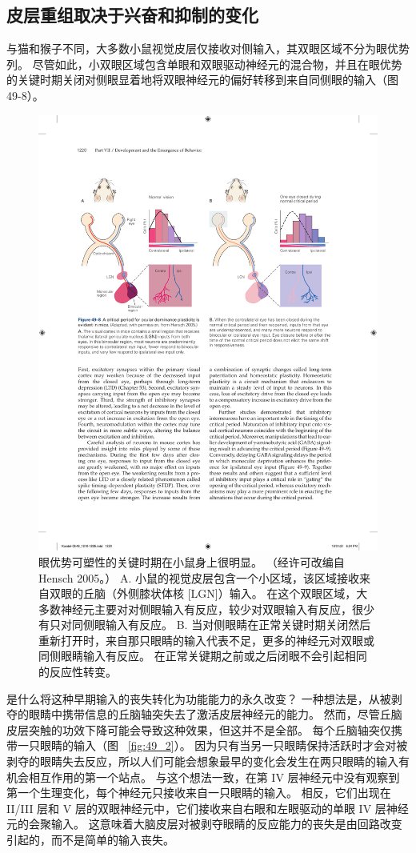 \subsection{皮层重组取决于兴奋和抑制的变化}

与猫和猴子不同，大多数小鼠视觉皮层仅接收对侧输入，其双眼区域不分为眼优势列。
尽管如此，小双眼区域包含单眼和双眼驱动神经元的混合物，并且在眼优势的关键时期关闭对侧眼显着地将双眼神经元的偏好转移到来自同侧眼的输入（图 49-8）。


\begin{figure}[htbp]
	\centering
	\includegraphics[width=0.9\linewidth]{chap49/fig_49_8}
	\caption{眼优势可塑性的关键时期在小鼠身上很明显。 （经许可改编自 Hensch 2005。） A. 小鼠的视觉皮层包含一个小区域，该区域接收来自双眼的丘脑（外侧膝状体核 [LGN]）输入。 在这个双眼区域，大多数神经元主要对对侧眼输入有反应，较少对双眼输入有反应，很少有只对同侧眼输入有反应。 B. 当对侧眼睛在正常关键时期关闭然后重新打开时，来自那只眼睛的输入代表不足，更多的神经元对双眼或同侧眼睛输入有反应。 在正常关键期之前或之后闭眼不会引起相同的反应性转变。}
	\label{fig:49_8}
\end{figure}


是什么将这种早期输入的丧失转化为功能能力的永久改变？
一种想法是，从被剥夺的眼睛中携带信息的丘脑轴突失去了激活皮层神经元的能力。
然而，尽管丘脑皮层突触的功效下降可能会导致这种效果，但这并不是全部。
每个丘脑轴突仅携带一只眼睛的输入（图 ~\ref{fig:49_2}）。
因为只有当另一只眼睛保持活跃时才会对被剥夺的眼睛失去反应，所以人们可能会想象最早的变化会发生在两只眼睛的输入有机会相互作用的第一个站点。
与这个想法一致，在第 IV 层神经元中没有观察到第一个生理变化，每个神经元只接收来自一只眼睛的输入。
相反，它们出现在 II/III 层和 V 层的双眼神经元中，它们接收来自右眼和左眼驱动的单眼 IV 层神经元的会聚输入。
这意味着大脑皮层对被剥夺眼睛的反应能力的丧失是由回路改变引起的，而不是简单的输入丧失。


